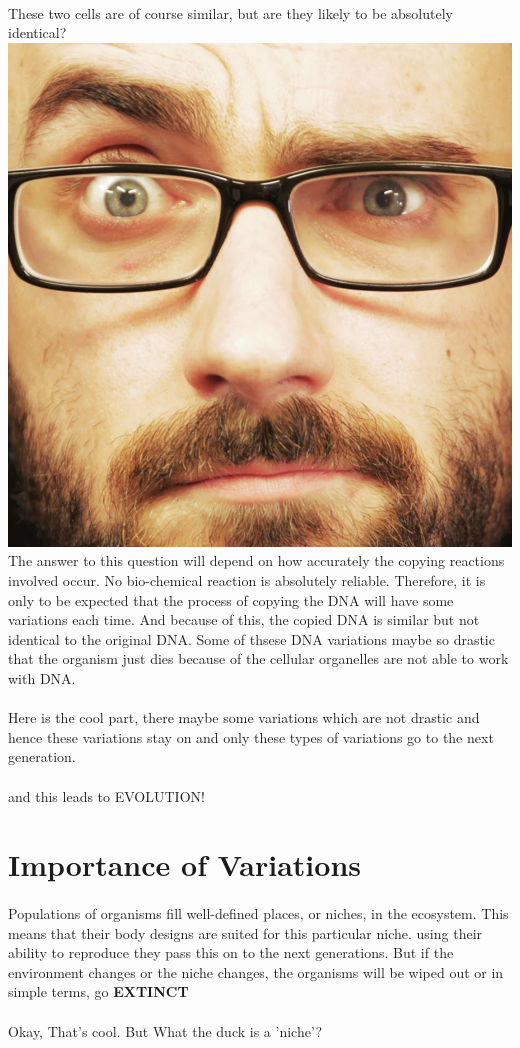 \documentclass[A4]{article}
\newcommand{\vsauce}{\includegraphics[scale=0.015]{vsauce-eyes.jpg}}
\begin{document}
    \paragraph{}
    These two cells are of course similar, but are they likely to be absolutely identical? \vsauce
    The answer to this question will depend on how accurately the copying reactions involved occur. 
    No bio-chemical reaction is absolutely reliable. 
    Therefore, it is only to be expected that the process of copying the DNA will have some variations each time.
    And because of this, the copied DNA is similar but not identical to the original DNA.
    Some of thsese DNA variations maybe so drastic that the organism just dies because of the cellular organelles are not able to work with DNA. 
    \paragraph{}
    Here is the cool part, there maybe some variations which are not drastic and hence these variations stay on and only these types of variations go to the next generation.\\ 
    \paragraph{}
    {\Huge{and this leads to EVOLUTION!}}
    \section{Importance of Variations}
    \paragraph{}
    Populations of organisms fill well-defined places, or niches, in the ecosystem. 
    This means that their body designs are suited for this particular niche. 
    using their ability to reproduce they pass this on to the next generations.
    But if the environment changes or the niche changes, the organisms will be wiped out or in simple terms, go \textbf{EXTINCT}
    \paragraph{}
    Okay, That's cool. But What the duck is a 'niche'? \\
    
\end{document}
